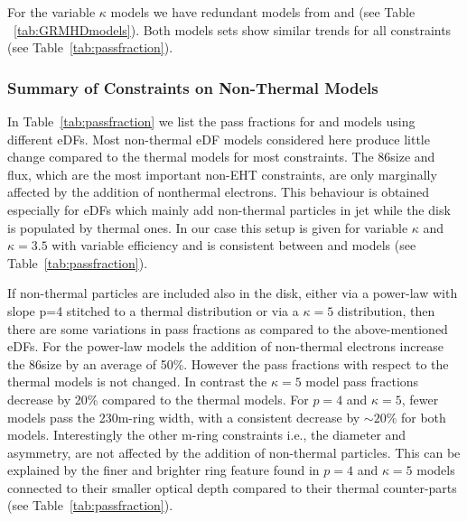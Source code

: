 
For the variable $\kappa$ models we have redundant models from \bhac and \hamr (see Table ~\ref{tab:GRMHDmodels}).
Both models sets show similar trends for all constraints (see Table~\ref{tab:passfraction}).  

\subsubsection{Summary of Constraints on Non-Thermal Models}



In Table~\ref{tab:passfraction} we list the pass fractions for \bhac and \hamr models using different eDFs.
Most non-thermal eDF models considered here produce little change compared to the thermal models for most constraints.
The 86\GHz size and flux, which are the most important non-EHT constraints, are only marginally affected by the addition of nonthermal electrons.
This behaviour is obtained especially for eDFs which mainly add non-thermal particles in jet while the disk is populated by thermal ones.
In our case this setup is given for variable $\kappa$ and $\kappa=3.5$ with variable efficiency and is consistent between \bhac and \hamr models (see Table~\ref{tab:passfraction}).

If non-thermal particles are included also in the disk, either via a power-law with slope p=4 stitched to a thermal distribution or via a $\kappa=5$ distribution, then there are some variations in pass fractions as compared to the above-mentioned eDFs.  For the power-law models the addition of non-thermal electrons increase the 86\GHz size by an average of 50\%.
However the pass fractions with respect to the thermal models is not changed.
In contrast the $\kappa=5$ model pass fractions decrease by 20\% compared to the thermal models.
For $p=4$ and $\kappa=5$, fewer models pass the 230\GHz m-ring width, with a consistent decrease by $\sim20\%$ for both models.
Interestingly the other m-ring constraints i.e., the diameter and asymmetry, are not affected by the addition of non-thermal particles.
This can be explained by the finer and brighter ring feature found in $p=4$ and $\kappa=5$ models connected to their smaller optical depth compared to their thermal counter-parts (see Table~\ref{tab:passfraction}).


